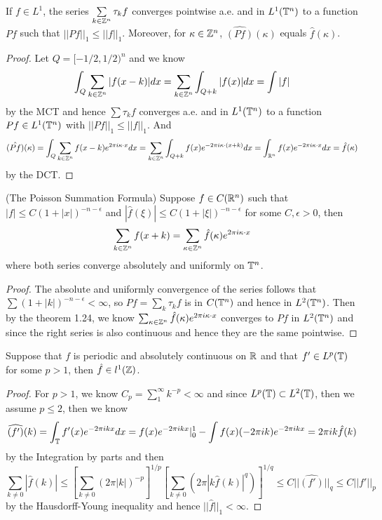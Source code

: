 \begin{theorem}
    If $f\in L^1$, the series $\sum\limits_{k\in\mathbb{Z}^n}\tau_kf$ converges pointwise a.e. and in $L^1(\mathbb{T}^n)$ to a function $Pf$ such that $||Pf||_1 \leq ||f||_1$. Moreover, for $\kappa \in \mathbb{Z}^n$, $\hat{(Pf)}(\kappa)$ equals $\hat{f}(\kappa)$.
\end{theorem}
\begin{proof}\par
    Let $Q = [-1/2,1/2)^n$ and we know
    \[
    \int_Q \sum_{k\in\mathbb{Z}^n}|f(x-k)|dx = \sum\limits_{k\in\mathbb{Z}^n}\int_{Q+k}|f(x)| dx = \int |f|
    \]
    by the MCT and hence $\sum \tau_k f$ converges a.e. and in $L^1(\mathbb{T}^n)$ to a function $Pf \in L^1(\mathbb{T}^n)$ with $||Pf||_1 \leq ||f||_1$. And
    \[
    \hat{(Pf)}(\kappa) = \int_Q\sum\limits_{k\in \mathbb{Z}^n} f(x-k)e^{2\pi i \kappa\cdot x}dx = \sum\limits_{k\in\mathbb{Z}^n}\int_{Q+k}f(x)e^{-2\pi i \kappa \cdot(x+k)}dx = \int_{\mathbb{R}^n} f(x)e^{-2\pi i \kappa\cdot x} dx = \hat{f}(\kappa)
    \]
    by the DCT.
\end{proof}

\begin{theorem}
    (The Poisson Summation Formula) Suppose $f\in C(\mathbb{R}^n)$ such that $|f| \leq C(1+|x|)^{-n-\epsilon}$ and $|\hat{f}(\xi)| \leq C(1+|\xi|)^{-n-\epsilon}$ for some $C,\epsilon >0$, then
    \[
    \sum\limits_{k\in\mathbb{Z}^n} f(x+k) = \sum\limits_{\kappa\in\mathbb{Z}^n} \hat{f}(\kappa)e^{2\pi i \kappa\cdot x}
    \]
    where both series converge absolutely and uniformly on $\mathbb{T}^n$. 
\end{theorem}
\begin{proof}\par
    The absolute and uniformly convergence of the series follows that $\sum (1+|k|)^{-n-\epsilon} < \infty$, so $Pf = \sum_k \tau_k f$ is in $C(\mathbb{T}^n)$ and hence in $L^2(\mathbb{T}^n)$. Then by the theorem 1.24, we know $\sum_{\kappa\in\mathbb{Z}^n}\hat{f}(\kappa)e^{2\pi i \kappa\cdot x}$ converges to $Pf$ in $L^2(\mathbb{T}^n)$ and since the right series is also continuous and hence they are the same pointwise.
\end{proof}

\begin{theorem}
    Suppose that $f$ is periodic and absolutely continuous on $\mathbb{R}$ and that $f'\in L^p(\mathbb{T})$ for some $p>1$, then $\hat{f}\in l^1(\mathbb{Z})$.
\end{theorem}
\begin{proof}\par
    For $p>1$, we know $C_p = \sum_1^{\infty}k^{-p}<\infty$ and since $L^p(\mathbb{T})\subset L^2(\mathbb{T})$, then we assume $p\leq 2$, then we know
    \[
    \widehat{(f')}(k) = \int_{\mathbb{T}} f'(x)e^{-2\pi i kx}dx = f(x)e^{-2\pi i kx}|^1_0 - \int f(x)(-2\pi i k)e^{-2\pi i k x} = 2\pi i k \hat{f}(k)
    \]
    by the Integration by parts and then
    \[
    \sum_{k\neq 0}|\hat{f}(k)| \leq [\sum_{k\neq 0}(2\pi|k|)^{-p}]^{1/p}[\sum_{k\neq 0}(2\pi|k\hat{f}(k)|^q)]^{1/q} \leq C||\widehat{(f')}||_q \leq C||f'||_p
    \]
    by the Hausdorff-Young inequality and hence $||\hat{f}||_1 < \infty$.
\end{proof}

